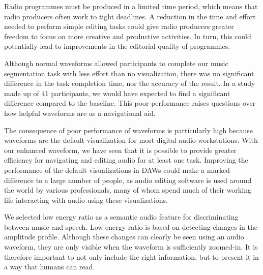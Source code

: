 Radio programmes must be produced in a limited time period, which means that radio producers often work to tight
deadlines. A reduction in the time and effort needed to perform simple editing tasks could give radio producers greater
freedom to focus on more creative and productive activities. In turn, this could potentially lead to improvements in the
editorial quality of programmes.

Although normal waveforms allowed participants to complete our music segmentation task with less effort than no
visualization, there was no significant difference in the task completion time, nor the accuracy of the result.  In a
study made up of 41 participants, we would have expected to find a significant difference compared to the baseline.
This poor performance raises questions over how helpful waveforms are as a navigational aid.

The consequence of poor performance of waveforms is particularly high because waveforms are the default visualization
for most digital audio workstations. With our enhanced waveform, we have seen that it is possible to provide greater
efficiency for navigating and editing audio for at least one task.  Improving the performance of the default
visualizations in DAWs could make a marked difference to a large number of people, as audio editing software is
used around the world by various professionals, many of whom spend much of their working life interacting with audio
using these visualizations.

We selected low energy ratio as a semantic audio feature for discriminating between music and speech.  Low energy ratio
is based on detecting changes in the amplitude profile.  Although these changes can clearly be seen using an audio
waveform, they are only visible when the waveform is sufficiently zoomed-in.  It is therefore important to not only
include the right information, but to present it in a way that humans can read.

